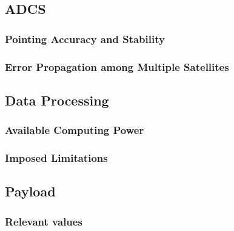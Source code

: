 \documentclass[a4paper,10pt]{article}
\begin{document}
\subsection{ADCS}
\subsubsection{Pointing Accuracy and Stability}
\subsubsection{Error Propagation among Multiple Satellites}

\subsection{Data Processing}
\subsubsection{Available Computing Power}
\subsubsection{Imposed Limitations}

\subsection{Payload}
\subsubsection{Relevant values}
\end{document}
